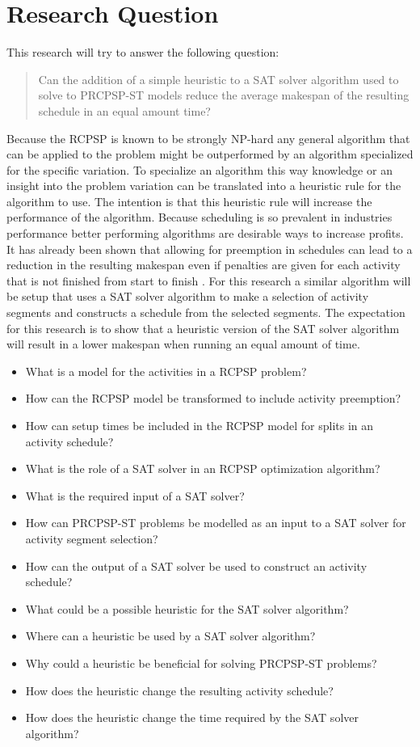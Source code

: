 \documentclass[english]{article}
\begin{document}
\section*{Research Question}
This research will try to answer the following question:
\begin{quote}
Can the addition of a simple heuristic to a SAT solver algorithm used to solve to PRCPSP-ST models reduce the average makespan of the resulting schedule in an equal amount time?
\end{quote}
Because the RCPSP is known to be strongly NP-hard \cite{RN15} any general algorithm that can be applied to the problem might be outperformed by an algorithm specialized for the specific variation.
To specialize an algorithm this way knowledge or an insight into the problem variation can be translated into a heuristic rule for the algorithm to use. The intention is that this heuristic rule will increase the performance of the algorithm. Because scheduling is so prevalent in industries performance better performing algorithms are desirable ways to increase profits.\\
It has already been shown that allowing for preemption in schedules can lead to a reduction in the resulting makespan even if penalties are given for each activity that is not finished from start to finish \cite{RN1}.
For this research a similar algorithm will be setup that uses a SAT solver algorithm to make a selection of activity segments and constructs a schedule from the selected segments. The expectation for this research is to show that a heuristic version of the SAT solver algorithm will result in a lower makespan when running an equal amount of time.

{\begin{itemize}
    \item What is a model for the activities in a RCPSP problem?
    \item How can the RCPSP model be transformed to include activity preemption?
    \item How can setup times be included in the RCPSP model for splits in an activity schedule?
    \item What is the role of a SAT solver in an RCPSP optimization algorithm?
    \item What is the required input of a SAT solver?
    \item How can PRCPSP-ST problems be modelled as an input to a SAT solver for activity segment selection?
    \item How can the output of a SAT solver be used to construct an activity schedule?
    \item What could be a possible heuristic for the SAT solver algorithm?
    \item Where can a heuristic be used by a SAT solver algorithm?
    \item Why could a heuristic be beneficial for solving PRCPSP-ST problems?
    \item How does the heuristic change the resulting activity schedule?
    \item How does the heuristic change the time required by the SAT solver algorithm?
\end{itemize}{}}
\end{document}
